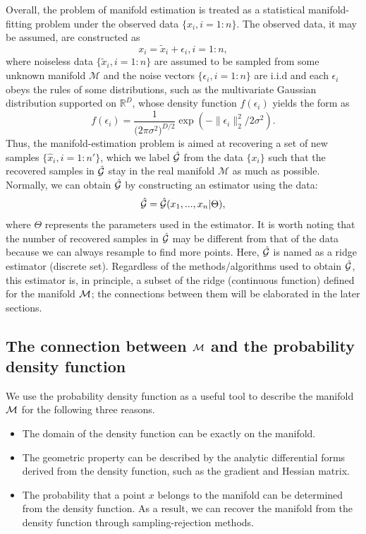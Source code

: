 \documentclass[aos,preprint]{imsart}
\theoremstyle{remark}
\begin{document}
Overall, the problem of manifold estimation is treated as a statistical manifold-fitting problem under the observed data $\{x_i, i=1:n\}$. The observed data, it may be assumed, are constructed as 
\begin{equation}\label{model_ass}
x_i=\tilde{x}_i+\epsilon_i, i=1:n,
\end{equation}
where noiseless data $\{\tilde{x}_i, i= 1:n\}$ are assumed to be sampled from some unknown manifold $\mathcal M$ and the noise vectors $\{\epsilon_i, i= 1:n\}$ are i.i.d and each $\epsilon_i$ obeys the rules of some distributions, such as the multivariate Gaussian distribution supported on ${\mathbb R}^D$, whose density function $f(\epsilon_i)$ yields the form as
\[
f(\epsilon_i)= \frac{1}{{({2\pi\sigma^2)}^{D/2}}}\exp(-\|\epsilon_i\|_2^2/2\sigma^2).
\]%
Thus, the manifold-estimation problem is aimed at recovering a set of new samples $\{\hat{x}_i, i= 1:n'\}$, which we label $\hat{\cal G}$ from the data $\{x_i\}$ such that the recovered samples in $\hat{\cal G}$ stay in the real manifold $\mathcal M$ as much as possible. Normally, we can obtain $\hat{\cal G}$ by constructing an estimator using the data:
\begin{equation}\label{Estimator}
\hat{\cal G} = \hat{\cal G}(x_1,...,x_n | \Theta),
\end{equation}
where $\Theta$ represents the parameters used in the estimator. It is worth noting that the number of recovered samples in $\hat{\cal G}$ may be different from that of the data because we can always resample to find more points. Here, $\hat{\cal G}$ is named as a ridge estimator (discrete set). Regardless of the methods/algorithms used to obtain $\hat{\cal G}$, this estimator is, in principle, a subset of the ridge (continuous function) defined for the manifold $\cal{M}$; the connections between them will be elaborated in the later sections.



\subsection{The connection between $\cal M$ and the probability density function}
We use the probability density function as a useful tool to describe the manifold $\cal M$ for the following three reasons.
\begin{itemize}
\item The domain of the density function can be exactly on the manifold. 
\item The geometric property can be described by the analytic differential forms derived from the density function, such as the gradient and Hessian matrix.
\item The probability that a point $x$ belongs to the manifold can be determined from the density function. As a result, we can recover the manifold from the density function through sampling-rejection methods.
\end{itemize}
\end{document}
